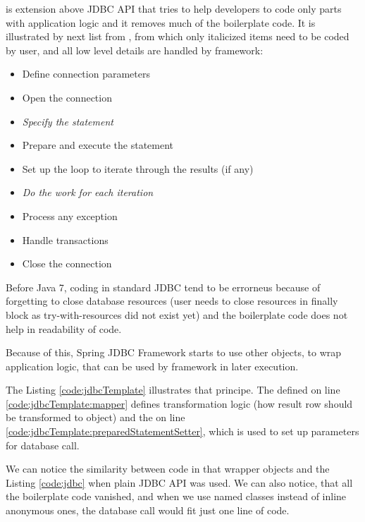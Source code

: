 \citet{SpringJDBC} is extension above JDBC API that tries to help developers to code only
parts with application logic and it removes much of the boilerplate code.
It is illustrated by next list from \citet{SpringJDBC}, from which only
italicized items need to be coded by user, and all low level details
are handled by framework:
\begin{itemize}
  \item Define connection parameters
  \item Open the connection
  \item \textit{Specify the statement}
  \item Prepare and execute the statement
  \item Set up the loop to iterate through the results (if any)
  \item \textit{Do the work for each iteration}
  \item Process any exception
  \item Handle transactions
  \item Close the connection   
\end{itemize}

Before Java 7, coding in standard JDBC tend to be errorneus because of forgetting to close
database resources (user needs to close resources in finally block as try-with-resources did not exist yet)
and the boilerplate code does not help in readability of code.

Because of this, Spring JDBC Framework starts to use other objects,
to wrap application logic, that can be used by framework in later execution.

The Listing \ref{code:jdbcTemplate} illustrates that principe.
The  defined on line \ref{code:jdbcTemplate:mapper} defines transformation
logic (how result row should be transformed to  object)
and the  on line \ref{code:jdbcTemplate:preparedStatementSetter},
which is used to set up parameters for database call.

We can notice the similarity between code in that wrapper objects and the Listing
\ref{code:jdbc} when plain JDBC API was used. We can also notice, that all the boilerplate code vanished,
and when we use named classes instead of inline anonymous ones, the database call would fit just one line of code.







